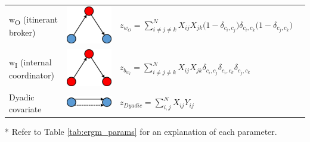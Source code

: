 \begin{table}
{\begin{threeparttable}
\begin{tabular}{l c l l}
w\textsubscript{O} (itinerant broker) & \begin{minipage}{.12\textwidth} \centering \includegraphics[width=0.4\linewidth]{Images/w_O} \end{minipage} & $z_{w_O} = \sum_{i \neq j \neq k}^N X_{ij} X_{jk} \bigg(1 - \delta_{c_i,c_j} \bigg) \delta_{c_i,c_k} \bigg(1 - \delta_{c_j,c_k} \bigg)$ & \\
w\textsubscript{I} (internal coordinator) & \begin{minipage}{.12\textwidth} \centering \includegraphics[width=0.4\linewidth]{Images/w_I} \end{minipage} & $z_{b_{w_I}} = \sum_{i \neq j \neq k}^N X_{ij} X_{jk} \delta_{c_i,c_j} \delta_{c_i,c_k} \delta_{c_j,c_k}$ & \\
Dyadic covariate & \begin{minipage}{.12\textwidth} \centering \includegraphics[width=0.4\linewidth]{Images/DyadicCovariate} \end{minipage} & $z_{Dyadic} = \sum_{i,j}^N X_{ij} Y_{ij}$ & \\
\bottomrule
\end{tabular}
\begin{tablenotes}
\footnotesize
\item[*] Refer to Table \ref{tab:ergm_params} for an explanation of each parameter.
\end{tablenotes}

\end{threeparttable}%
}
\end{table}